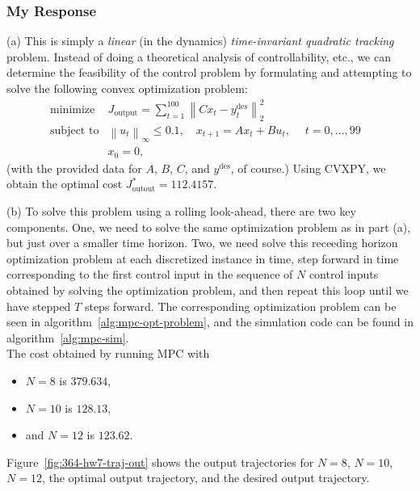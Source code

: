 \documentclass[12pt,reqno]{article}
\theoremstyle{definition}
\numberwithin{equation}{section}
\begin{document}
\subsubsection*{My Response}
    
    \noindent (a) This is simply a \textit{linear} (in the dynamics) \textit{time-invariant quadratic tracking} problem.
    Instead of doing a theoretical analysis of controllability, etc., we can determine the feasibility
    of the control problem by formulating and attempting to solve the following convex optimization problem:
    \[\begin{array}{lll}
    \text{minimize} \; & J_{\text{output}} = \sum_{t=1}^{100}\left\lVert Cx_t - y_t^{\text{des}} \right\rVert_{2}^2 & \\
    \text{subject to} & \left\lVert u_t \right\rVert_{\infty} \le 0.1, \quad x_{t+1} = Ax_t + Bu_t, \; \quad t = 0, \ldots, 99 & \\
    &x_0 = 0,
    \end{array}\]
    (with the provided data for $A$, $B$, $C$, and $y^{\text{des}}$, of course.) Using CVXPY, we obtain the optimal cost 
    $J_{\text{outout}}^{*} = 112.4157$.
    
    \noindent (b) 
    To solve this problem using a rolling look-ahead, there are two key components. One, we need
    to solve the same optimization problem as in part (a), but just over a smaller time horizon. Two,
    we need solve this receeding horizon optimization problem at each discretized instance in time,
    step forward in time corresponding to the first control input in the sequence of $N$ control inputs obtained by solving the optimization problem, 
    and then repeat this loop until we have stepped $T$ steps forward. The corresponding
    optimization problem can be seen in algorithm~\ref{alg:mpc-opt-problem}, and the simulation
    code can be found in algorithm~\ref{alg:mpc-sim}.\\
    \noindent The cost obtained by running MPC with
    \begin{itemize}
        \item $N = 8$ is $379.634$,
        \item $N = 10$ is $128.13$,
        \item and $N=12$ is $123.62$.
    \end{itemize}
    Figure~\ref{fig:364-hw7-traj-out} shows the output trajectories for $N=8$, $N=10$, $N=12$,
    the optimal output trajectory, and the desired output trajectory.
\end{document}
